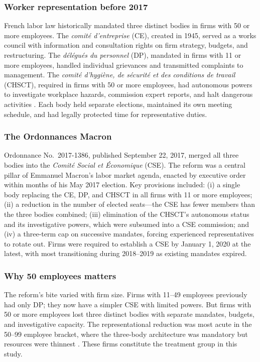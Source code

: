 \documentclass[12pt]{article}
\begin{document}
\subsubsection*{Worker representation before 2017} French labor law historically mandated three distinct bodies in firms with 50 or more employees. The \textit{comit\'e d'entreprise} (CE), created in 1945, served as a works council with information and consultation rights on firm strategy, budgets, and restructuring. The \textit{d\'el\'egu\'es du personnel} (DP), mandated in firms with 11 or more employees, handled individual grievances and transmitted complaints to management. The \textit{comit\'e d'hygiène, de s\'ecurit\'e et des conditions de travail} (CHSCT), required in firms with 50 or more employees, had autonomous powers to investigate workplace hazards, commission expert reports, and halt dangerous activities \citep{ferracci2014}. Each body held separate elections, maintained its own meeting schedule, and had legally protected time for representative duties.

\subsubsection*{The Ordonnances Macron} Ordonnance No.\ 2017-1386, published September 22, 2017, merged all three bodies into the \textit{Comit\'e Social et \'Economique} (CSE). The reform was a central pillar of Emmanuel Macron's labor market agenda, enacted by executive order within months of his May 2017 election. Key provisions included: (i) a single body replacing the CE, DP, and CHSCT in all firms with 11 or more employees; (ii) a reduction in the number of elected seats---the CSE has fewer members than the three bodies combined; (iii) elimination of the CHSCT's autonomous status and its investigative powers, which were subsumed into a CSE commission; and (iv) a three-term cap on successive mandates, forcing experienced representatives to rotate out. Firms were required to establish a CSE by January 1, 2020 at the latest, with most transitioning during 2018--2019 as existing mandates expired.

\subsubsection*{Why 50 employees matters} The reform's bite varied with firm size. Firms with 11--49 employees previously had only DP; they now have a simpler CSE with limited powers. But firms with 50 or more employees lost three distinct bodies with separate mandates, budgets, and investigative capacity. The representational reduction was most acute in the 50--99 employee bracket, where the three-body architecture was mandatory but resources were thinnest \citep{cahuc2014}. These firms constitute the treatment group in this study.
\end{document}
